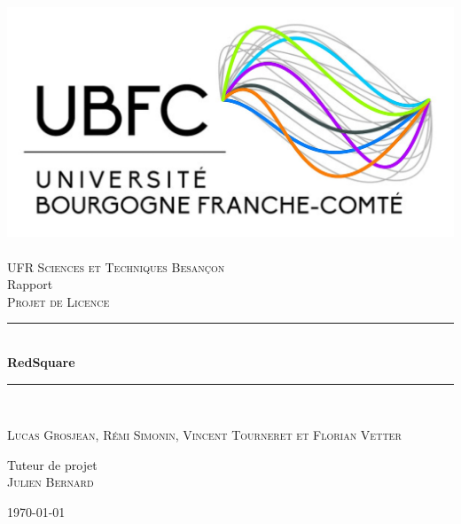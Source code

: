 \documentclass[a4paper, 12pt]{article}
\begin{document}
\begin{titlepage}
\begin{center}

\includegraphics[scale=0.25]{./TiltelPage/Logo}~\\[1cm]

\textsc{\LARGE UFR Sciences et Techniques  Besançon}\\[1.5cm]
Rapport\\
\textsc{Projet de Licence}

\newcommand{\HRule}{\rule{\linewidth}{0.5mm}}

\HRule \\[0.4cm]

{\huge \bfseries RedSquare}

\HRule \\[1.5cm]

\end{center}
\begin{minipage}{0.9\textwidth}
\begin{center} \large

\textsc{Lucas Grosjean, }
\textsc{Rémi Simonin, }
\textsc{Vincent Tourneret}
\textsc{et Florian Vetter}
\end{center}
\end{minipage}
\newline

\begin{center} \large
Tuteur de projet\\
\textsc{Julien Bernard}
\end{center}

\vfill

\begin{center}
{\large \today}
\end{center}

\end{titlepage}
\end{document}
